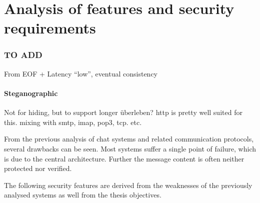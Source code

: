 \chapter{Analysis of features and security requirements}
\label{requirements}

\subsection{TO ADD}
From EOF + Latency "`low"', eventual consistency

\subsubsection{Steganographic}
Not for hiding, but to support longer überleben?
http is pretty well suited for this.
mixing with smtp, imap, pop3, tcp. etc.


From the previous analysis of chat systems and related communication protocols,
several drawbacks can be seen. Most systems suffer a single point of failure,
which is due to the central architecture. Further the message content is often
neither protected nor verified.

The following security features are derived from the weaknesses of the previously
analysed systems as well from the thesis objectives.
